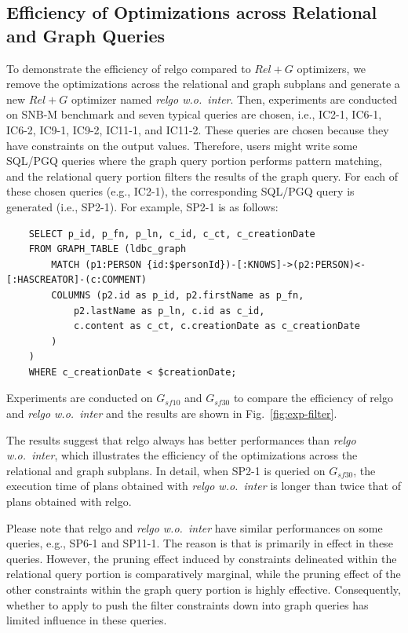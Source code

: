 \subsection{Efficiency of Optimizations across Relational and Graph Queries}
\label{sec:experiment-case-study}

To demonstrate the efficiency of relgo compared to $Rel+G$ optimizers, we remove the optimizations across the relational and graph subplans and generate a new $Rel+G$ optimizer named \textit{relgo w.o.~inter}.
Then, experiments are conducted on SNB-M benchmark and seven typical queries are chosen, i.e., IC2-1, IC6-1, IC6-2, IC9-1, IC9-2, IC11-1, and IC11-2.
These queries are chosen because they have constraints on the output values.
Therefore, users might write some SQL/PGQ queries where the graph query portion performs pattern matching, and the relational query portion filters the results of the graph query.
For each of these chosen queries (e.g., IC2-1), the corresponding SQL/PGQ query is generated (i.e., SP2-1).
For example, SP2-1 is as follows:
\begin{lstlisting}
    SELECT p_id, p_fn, p_ln, c_id, c_ct, c_creationDate
    FROM GRAPH_TABLE (ldbc_graph
        MATCH (p1:PERSON {id:$personId})-[:KNOWS]->(p2:PERSON)<-[:HASCREATOR]-(c:COMMENT)
        COLUMNS (p2.id as p_id, p2.firstName as p_fn,
            p2.lastName as p_ln, c.id as c_id,
            c.content as c_ct, c.creationDate as c_creationDate
        )
    )
    WHERE c_creationDate < $creationDate;
\end{lstlisting}
Experiments are conducted on $G_{sf10}$ and $G_{sf30}$ to compare the efficiency of relgo and \textit{relgo w.o.~inter} and the results are shown in Fig.~\ref{fig:exp-filter}.


The results suggest that relgo always has better performances than \textit{relgo w.o.~inter}, which illustrates the efficiency of the optimizations across the relational and graph subplans.
In detail, when SP2-1 is queried on $G_{sf30}$, the execution time of plans obtained with \textit{relgo w.o.~inter} is longer than twice that of plans obtained with relgo.

Please note that relgo and \textit{relgo w.o.~inter} have similar performances on some queries, e.g., SP6-1 and SP11-1.
The reason is that \filterrule is primarily in effect in these queries.
However, the pruning effect induced by constraints delineated within the relational query portion is comparatively marginal, while the pruning effect of the other constraints within the graph query portion is highly effective.
Consequently, whether to apply \filterrule to push the filter constraints down into graph queries has limited influence in these queries.

